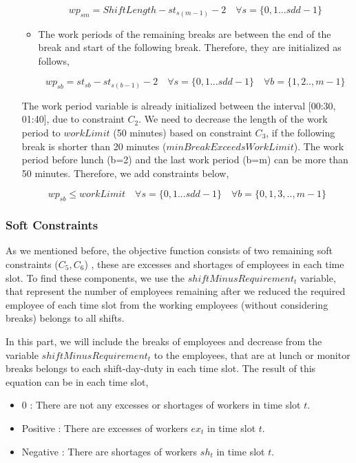 \begin{itemize}
\begin{itemize}
\begin{equation}
wp_{sm} = Shift Length - st_{s(m-1)} - 2 \quad \forall s = \{0, 1 ...sdd -1\}
\end{equation}

\item The work periods of the remaining breaks are between the end of the break and start of the following break. Therefore, they are initialized as follows,


\begin{equation}
wp_{sb} = st_{sb} - st_{s(b-1)}  -2 \quad \forall s = \{0, 1 ...sdd -1\} \quad \forall b = \{1,2.., m-1\}
\end{equation}

\end{itemize}

The work period variable is already initialized between the interval [00:30, 01:40], due to constraint $C_2$. We need to decrease the length of the work period to $workLimit$ (50 minutes) based on constraint $C_3$, if the following break is shorter than 20 minutes ($minBreakExceedsWorkLimit$). The work period before lunch (b=2) and the last work period (b=m) can be more than 50 minutes. Therefore, we add constraints below,

\begin{equation}
wp_{sb} \le workLimit \quad \forall s = \{0, 1 ...sdd -1\} \quad \forall b = \{0, 1, 3, .., m-1\}
\end{equation}

\end{itemize}

\subsubsection{Soft  Constraints}

As we mentioned before, the objective function consists of two remaining soft constraints ($C_5, C_6$) , these are excesses and shortages of employees in each time slot. To find these components, we use the $shiftMinusRequirement_t$ variable, that represent the number of employees remaining after we reduced the required employee of each time slot from the working employees (without considering breaks) belongs to all shifts. 

In this part, we will include the breaks of employees and decrease from the variable $shiftMinusRequirement_t$ to the employees, that are at lunch or monitor breaks belongs to each shift-day-duty in each time slot. The result of this equation can be in each time slot,
\begin{itemize}
\item 0 : There are not any excesses or shortages of workers in time slot $t$. 
\item Positive : There are excesses of workers $ex_t$ in time slot $t$. 
\item Negative : There are shortages of workers $sh_t$ in time slot $t$. 
\end{itemize}



